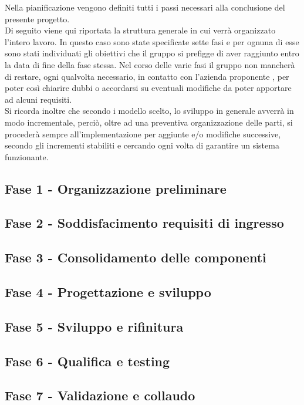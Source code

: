 Nella pianificazione vengono definiti tutti i passi necessari alla conclusione del presente progetto. \\
Di seguito viene qui riportata la struttura generale in cui verrà organizzato l'intero lavoro. In questo caso sono state specificate sette fasi e per ognuna di esse sono stati individuati gli obiettivi che il gruppo \Gruppo{} si prefigge di aver raggiunto entro la data di fine della fase stessa. Nel corso delle varie fasi il gruppo non mancherà di restare, ogni qualvolta necessario, in contatto con l'azienda proponente \proponente{}, per poter così chiarire dubbi o accordarsi su eventuali modifiche da poter apportare ad alcuni requisiti.\\
Si ricorda inoltre che secondo i modello scelto, lo sviluppo in generale avverrà in modo incrementale, perciò, oltre ad una preventiva organizzazione delle parti, si procederà sempre all'implementazione per aggiunte e/o modifiche successive, secondo gli incrementi stabiliti e cercando ogni volta di garantire un sistema funzionante.

\subsection{Fase 1 - Organizzazione preliminare}\label{sec:Fase1}


\subsection{Fase 2 - Soddisfacimento requisiti di ingresso}\label{sec:Fase2}

    
\subsection{Fase 3 - Consolidamento delle componenti}\label{sec:Fase3}

    
\subsection{Fase 4 - Progettazione e sviluppo}\label{sec:Fase4}

    
\subsection{Fase 5 - Sviluppo e rifinitura }\label{sec:Fase5}

    
\subsection{Fase 6 - Qualifica e testing}\label{sec:Fase6}

    
\subsection{Fase 7 - Validazione e collaudo}\label{sec:Fase7}
